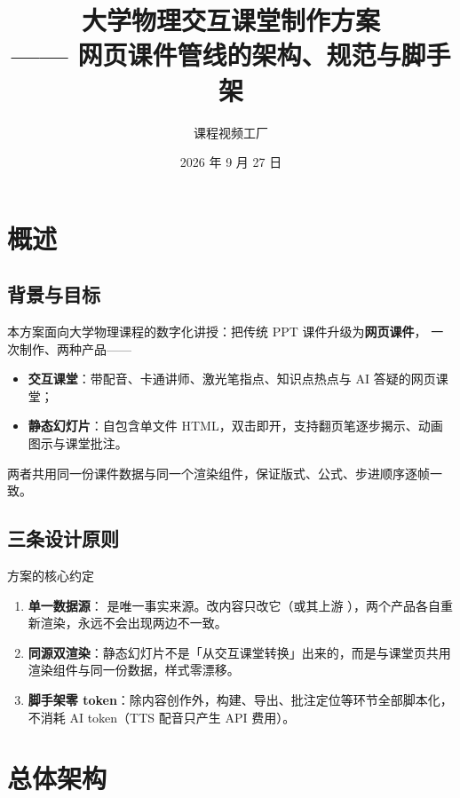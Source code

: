 \documentclass[11pt,fontset=fandol]{ctexart}
\title{\bfseries 大学物理交互课堂制作方案\\[4pt]
  \large —— 网页课件管线的架构、规范与脚手架}
\author{课程视频工厂}
\date{2026 年 9 月 27 日}
\begin{document}
\maketitle
\tableofcontents
\vspace{1em}

\section{概述}

\subsection{背景与目标}
本方案面向大学物理课程的数字化讲授：把传统 PPT 课件升级为\textbf{网页课件}，
一次制作、两种产品——
\begin{itemize}
  \item \textbf{交互课堂}：带配音、卡通讲师、激光笔指点、知识点热点与 AI 答疑的网页课堂；
  \item \textbf{静态幻灯片}：自包含单文件 HTML，双击即开，支持翻页笔逐步揭示、动画图示与课堂批注。
\end{itemize}
两者共用同一份课件数据与同一个渲染组件，保证版式、公式、步进顺序逐帧一致。

\subsection{三条设计原则}
\begin{rulebox}{方案的核心约定}
\begin{enumerate}
  \item \textbf{单一数据源}： 是唯一事实来源。改内容只改它（或其上游 ），两个产品各自重新渲染，永远不会出现两边不一致。
  \item \textbf{同源双渲染}：静态幻灯片不是「从交互课堂转换」出来的，而是与课堂页共用  渲染组件与同一份数据，样式零漂移。
  \item \textbf{脚手架零 token}：除内容创作外，构建、导出、批注定位等环节全部脚本化，不消耗 AI token（TTS 配音只产生 API 费用）。
\end{enumerate}
\end{rulebox}

\section{总体架构}
\end{document}
